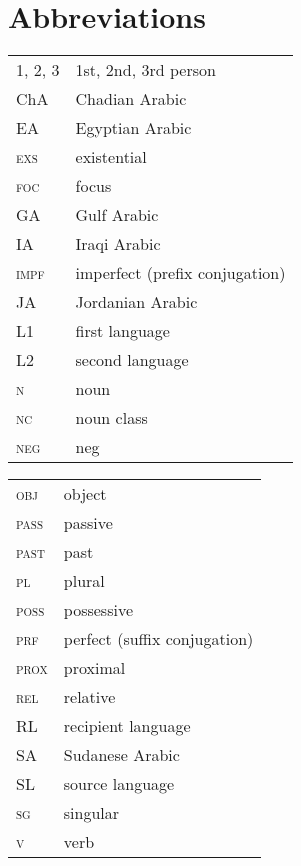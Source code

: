 \documentclass[output=paper]{langsci/langscibook}
\begin{document}
\section*{Abbreviations}
\begin{tabularx}{.5\textwidth}{@{}lQ@{}}
\textsc{1, 2, 3} & 1st, 2nd, 3rd person \\
ChA & Chadian Arabic \\
EA & Egyptian Arabic \\
\textsc{exs} & existential \\
\textsc{foc} & focus \\
GA & Gulf Arabic \\
IA & Iraqi Arabic \\
\textsc{impf} & imperfect (prefix conjugation) \\
JA & Jordanian Arabic \\
L1 & first language\\
L2 & second language\\
\textsc{n} & noun \\
\textsc{nc} & noun class \\
\textsc{neg} & neg \\
\end{tabularx}%
\begin{tabularx}{.5\textwidth}{@{}lQ@{}}
\textsc{obj} & object \\
\textsc{pass} & passive \\
\textsc{past} & past \\
\textsc{pl} & plural \\
\textsc{poss} & possessive \\
\textsc{prf} & perfect (suffix conjugation) \\
\textsc{prox} & proximal \\
\textsc{rel} & relative \\
RL & recipient language \\
SA & Sudanese Arabic \\
SL & source language \\
\textsc{sg} & singular \\
\textsc{v} & verb \\
\end{tabularx}%



\sloppy\printbibliography[heading=subbibliography,notkeyword=this]
\end{document}
